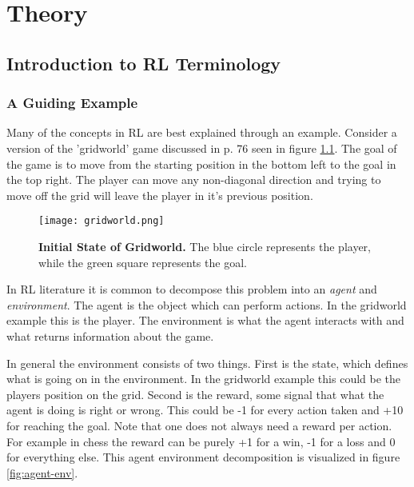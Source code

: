 
\chapter{Theory}\label{ch:theo}

\section{Introduction to RL Terminology}

\subsection{A Guiding Example}

Many of the concepts in RL are best explained through an example. Consider a version of the 'gridworld' game discussed in p. 76 \cite{barto_sutton_1983} seen in figure \ref{fig:gridworld}. The goal of the game is to move from the starting position in the bottom left to the goal in the top right. The player can move any non-diagonal direction and trying to move off the grid will leave the player in it's previous position.

\begin{figure}[H]
    \centering
    \texttt{[image: gridworld.png]}
    \captionsetup{width=.5\textwidth}
    \caption{\textbf{Initial State of Gridworld.} The blue circle represents the player, while the green square represents the goal.}
    \label{fig:gridworld}
\end{figure}

In RL literature it is common to decompose this problem into an \textit{agent} and \textit{environment}. The agent is the object which can perform actions. In the gridworld example this is the player. The environment is what the agent interacts with and what returns information about the game. 

In general the environment consists of two things. First is the state, which defines what is going on in the environment. In the gridworld example this could be the players position on the grid. Second is the reward, some signal that what the agent is doing is right or wrong. This could be -1 for every action taken and +10 for reaching the goal. Note that one does not always need a reward per action. For example in chess the reward can be purely +1 for a win, -1 for a loss and 0 for everything else. This agent environment decomposition is visualized in figure \ref{fig:agent-env}.

